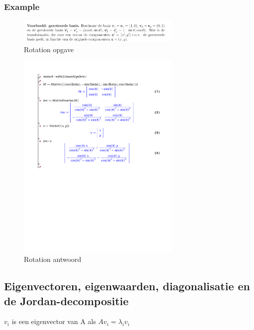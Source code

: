 \documentclass[a4paper]{report}
\begin{document}
\subsubsection{Example}

\begin{figure}[H]
	\begin{center}
		\includegraphics[width=0.7\textwidth]{./images/rotation.png}
	\end{center}
	\caption{Rotation opgave}
	\label{fig:rotation}
\end{figure}

\begin{figure}[H]
	\begin{center}
		\includegraphics[width=0.7\textwidth]{./rotation.pdf}
	\end{center}
	\caption{Rotation antwoord}
	\label{fig:rotationex}
\end{figure}

\subsection{Eigenvectoren, eigenwaarden, diagonalisatie en de Jordan-decompositie}

$v_i$ is een eigenvector van A als $Av_i = \lambda_i v_i$
\end{document}
